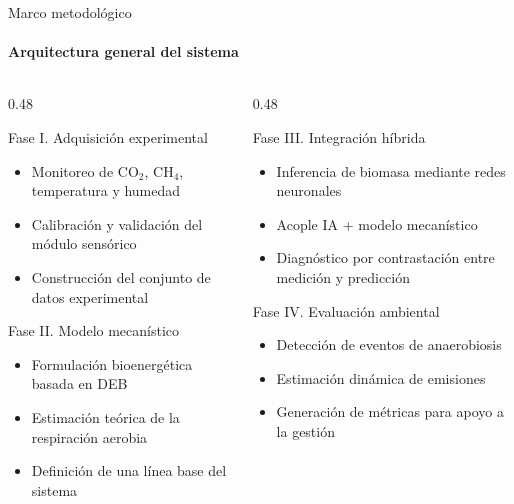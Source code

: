 \documentclass[aspectratio=169, 11pt]{beamer}
\begin{document}
\begin{frame}{Marco metodológico}
\framesubtitle{Arquitectura general del sistema}

\begin{columns}[T,onlytextwidth]

\begin{column}{0.48\textwidth}
\begin{block}{Fase I. Adquisición experimental}
\footnotesize
\begin{itemize}
    \item Monitoreo de CO$_2$, CH$_4$, temperatura y humedad
    \item Calibración y validación del módulo sensórico
    \item Construcción del conjunto de datos experimental
\end{itemize}
\end{block}

\vspace{0.2cm}

\begin{block}{Fase II. Modelo mecanístico}
\footnotesize
\begin{itemize}
    \item Formulación bioenergética basada en DEB
    \item Estimación teórica de la respiración aerobia
    \item Definición de una línea base del sistema
\end{itemize}
\end{block}
\end{column}

\begin{column}{0.48\textwidth}
\begin{block}{Fase III. Integración híbrida}
\footnotesize
\begin{itemize}
    \item Inferencia de biomasa mediante redes neuronales
    \item Acople IA + modelo mecanístico
    \item Diagnóstico por contrastación entre medición y predicción
\end{itemize}
\end{block}

\vspace{0.2cm}

\begin{alertblock}{Fase IV. Evaluación ambiental}
\footnotesize
\begin{itemize}
    \item Detección de eventos de anaerobiosis
    \item Estimación dinámica de emisiones
    \item Generación de métricas para apoyo a la gestión
\end{itemize}
\end{alertblock}
\end{column}


\end{columns}
\end{frame}
\end{document}
